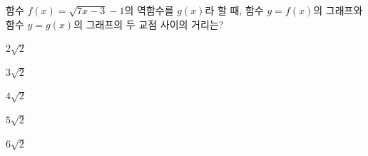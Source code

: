 \hspace*{2mm}\begin{minipage}[t]{\dimexpr\linewidth-2mm\relax}\vspace{0pt}
함수 $f(x)=\sqrt{7x-3}-1$의 역함수를 $g(x)$라 할 때, 함수 $y=f(x)$의 그래프와 함수 $y=g(x)$의 그래프의 두 교점 사이의 거리는?
\begin{choices32}{\rule[-3ex]{0pt}{8ex}$2\sqrt{2}$}{\rule[-3ex]{0pt}{8ex}$3\sqrt{2}$}{\rule[-3ex]{0pt}{8ex}$4\sqrt{2}$}{\rule[-3ex]{0pt}{8ex}$5\sqrt{2}$}{\rule[-3ex]{0pt}{8ex}$6\sqrt{2}$}\end{choices32}\end{minipage}
